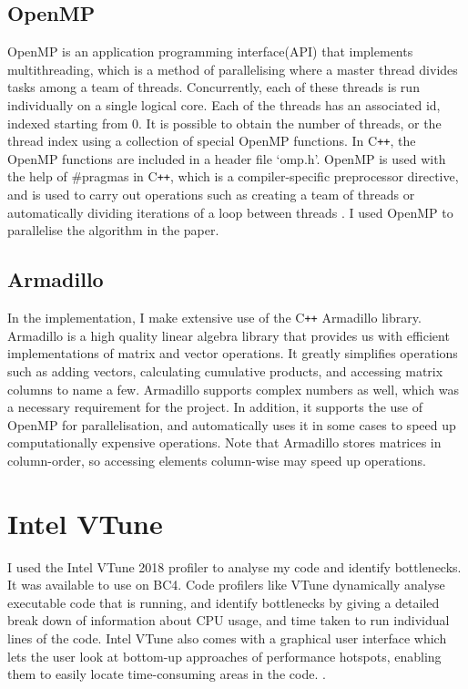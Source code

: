 \documentclass[ %
                    author={Manan Vaswani},
                supervisor={Dr. Raphael Clifford},
                    degree={MEng},
                     title={A multi-core CPU implementation of the classical Boson Sampling algorithm},
                  subtitle={},
                      type={},
                      year={2019} ]{dissertation}
\theoremstyle{plain}
\theoremstyle{definition}
\begin{document}
\subsection{OpenMP} \label{sec:openMP}
OpenMP is an application programming interface(API) that implements multithreading, which is a method of parallelising where a master thread divides tasks among a team of threads. Concurrently, each of these threads is run individually on a single logical core. Each of the threads has an associated id, indexed starting from 0. It is possible to obtain the number of threads, or the thread index using a collection of special OpenMP functions. In C\texttt{++}, the OpenMP functions are included in a header file `omp.h'. OpenMP is used with the help of \#pragmas in C\texttt{++}, which is a compiler-specific preprocessor directive, and is used to carry out operations such as creating a team of threads or automatically dividing iterations of a loop between threads \cite{dagum1998openmp}. I used OpenMP to parallelise the algorithm in the paper. 

\subsection{Armadillo} \label{sec:armadillo}
In the implementation, I make extensive use of the C\texttt{++} Armadillo library\cite{armadillo}. Armadillo is a high quality linear algebra library that provides us with efficient implementations of matrix and vector operations. It greatly simplifies operations such as adding vectors, calculating cumulative products, and accessing matrix columns to name a few. Armadillo supports complex numbers as well, which was a necessary requirement for the project. In addition, it supports the use of OpenMP for parallelisation, and automatically uses it in some cases to speed up computationally expensive operations. Note that Armadillo stores matrices in column-order, so accessing elements column-wise may speed up operations.

\section{Intel VTune} \label{sec:vtune}
I used the Intel VTune 2018 profiler to analyse my code and identify bottlenecks. It was available to use on BC4. Code profilers like VTune dynamically analyse executable code that is running, and identify bottlenecks by giving a detailed break down of information about CPU usage, and time taken to run individual lines of the code. Intel VTune also comes with a graphical user interface which lets the user look at bottom-up approaches of performance hotspots, enabling them to easily locate time-consuming areas in the code. \cite{vtune2018}.
\end{document}
